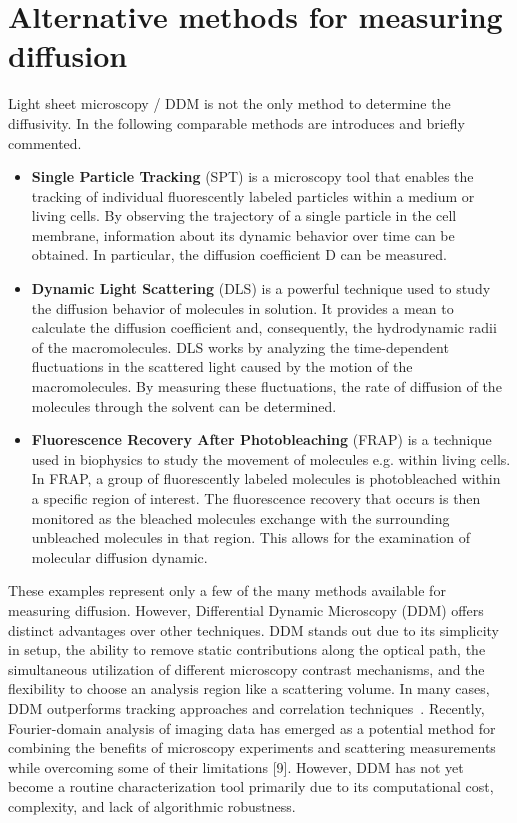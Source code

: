 \section[Alternative methods]{Alternative methods for measuring diffusion}
\label{sec:AlternativeMethods}

Light sheet microscopy / DDM is not the only method to determine the diffusivity. In the following comparable methods are introduces and briefly 
commented. 

\begin{itemize}
    \item \textbf{Single Particle Tracking} (SPT) is a microscopy tool that enables the tracking of individual fluorescently labeled particles 
    within a medium or living cells. By observing the trajectory of a single particle in the cell membrane, 
    information about its dynamic behavior over time can be obtained. In particular, the diffusion coefficient D can 
    be measured.
    \item \textbf{Dynamic Light Scattering} (DLS) is a powerful technique used to study the diffusion
    behavior of molecules in solution. It provides a mean to calculate the diffusion
    coefficient and, consequently, the hydrodynamic radii of the macromolecules. DLS works 
    by analyzing the time-dependent fluctuations in the scattered light caused by the motion
    of the macromolecules. By measuring these fluctuations, the rate of diffusion of the
    molecules through the solvent can be determined.
    \item \textbf{Fluorescence Recovery After Photobleaching} (FRAP) is a technique used in biophysics to study the movement of molecules e.g. within living cells. In FRAP, a group of fluorescently labeled molecules is photobleached
    within a specific region of interest. The fluorescence recovery that occurs is then
    monitored as the bleached molecules exchange with the surrounding unbleached molecules in
    that region. This allows for the examination of molecular diffusion dynamic.
\end{itemize}
  
These examples represent only a few of the many methods available for measuring diffusion. However, Differential Dynamic Microscopy (DDM) offers distinct advantages over other techniques. DDM stands out due to its simplicity in setup, the ability to remove static contributions along the optical path, the simultaneous utilization of different microscopy contrast mechanisms, and the flexibility to choose an analysis region like a scattering volume. In many cases, DDM outperforms tracking approaches and correlation techniques~\cite{Berne.2013}. Recently, Fourier-domain analysis of imaging data has emerged as a potential method for combining the benefits of microscopy experiments and scattering measurements while overcoming some of their limitations [9]. However, DDM has not yet become a routine characterization tool primarily due to its computational cost, complexity, and lack of algorithmic robustness.